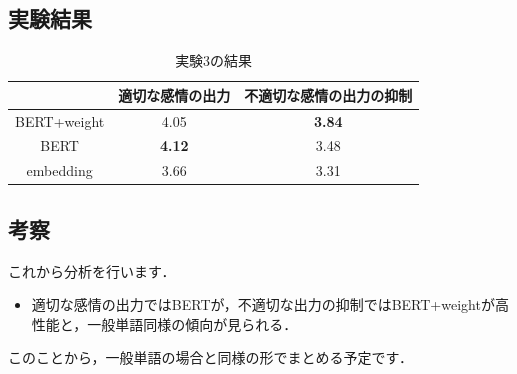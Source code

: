 	\subsection{実験結果}
	\begin{table}[H]
		\centering
		\caption{実験3の結果}
		\label{kansei_tagigo_result}
			\begin{tabular}{ccc}
				\hline
				& 適切な感情の出力 & 不適切な感情の出力の抑制 \\
				\hline \hline
				BERT+weight & 4.05 & \textbf{3.84} \\
				BERT & \textbf{4.12} & 3.48 \\
				embedding & 3.66 & 3.31 \\
				\hline
			\end{tabular}
	\end{table}

	\subsection{考察}
	これから分析を行います．
	\begin{itemize}
		\item 適切な感情の出力ではBERTが，不適切な出力の抑制ではBERT+weightが高性能と，一般単語同様の傾向が見られる．
	\end{itemize}
	このことから，一般単語の場合と同様の形でまとめる予定です．

